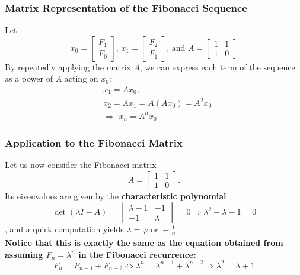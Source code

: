 \documentclass[11pt]{article}
\begin{document}
\subsubsection{Matrix Representation of the Fibonacci Sequence}
Let 
\[
    x_0=\begin{bmatrix}
        F_1\\F_0
    \end{bmatrix}
    \text{, } x_1 =\begin{bmatrix}
        F_2\\F_1
    \end{bmatrix}
    \text{, and }A=\begin{bmatrix}
        1&1\\1&0
    \end{bmatrix}
\]
By repeatedly applying the matrix $A$, we can express each term of the sequence as a power of $A$ acting on $x_0$:
\begin{align*}
    &x_1 = A x_0, \\
    &x_2 = A x_1 = A (A x_0) = A^2 x_0\\
    &\Rightarrow \,\, x_n = A^nx_0
\end{align*}
\subsubsection{Application to the Fibonacci Matrix}
Let us now consider the Fibonacci matrix
\[
    A = \begin{bmatrix} 1 & 1 \\ 1 & 0 \end{bmatrix}.
\]
Its eivenvalues are given by the \textbf{characteristic polynomial}
\[
    \det(\lambda I-A)=\begin{vmatrix}
        \lambda-1 & -1\\-1 & \lambda
    \end{vmatrix}=0 \Rightarrow \boxed{\lambda^2 - \lambda - 1 = 0}
\]
, and a quick computation yields $\displaystyle\lambda = \varphi \text{ or } -\frac{1}{\varphi}$.\\[.5em]
\textbf{Notice that this is exactly the same as the equation obtained from assuming $F_n = \lambda^n$ in the Fibonacci recurrence:}
\[
    F_n = F_{n-1} + F_{n-2} \Leftrightarrow \lambda^n  = \lambda^{n-1} + \lambda^{n-2} \Rightarrow  \boxed{\lambda^2  = \lambda + 1}
\]
\end{document}
